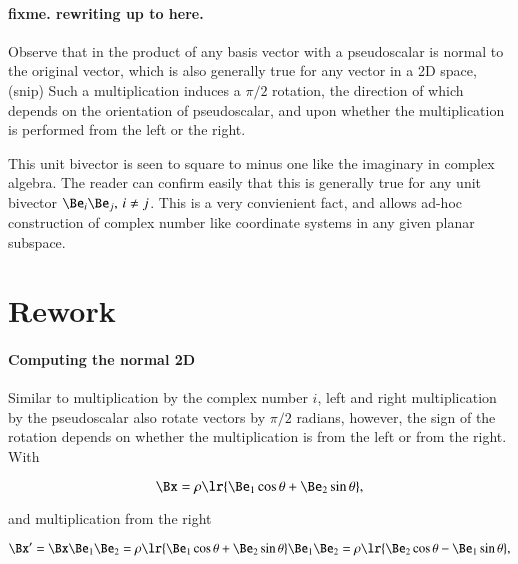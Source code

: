 \paragraph{fixme.  rewriting up to here.}

Observe that in  the product of any basis vector with a pseudoscalar is normal to the original vector, which is also generally true for any vector in a 2D space,
(snip)
Such a multiplication induces a \( \pi/2 \) rotation, the direction of which depends on the orientation of pseudoscalar, and upon whether the multiplication is performed from the left or the right.

This unit bivector is seen to square to minus one like the imaginary in complex algebra.
The reader can confirm easily that this is generally true for any unit bivector \( \Be_i \Be_j, \, i \ne j \).
This is a very convienient fact, and allows ad-hoc construction of complex number like coordinate systems in any given planar subspace.

\section{Rework}
\paragraph{Computing the normal 2D}

Similar to multiplication by the complex number \( i \),
left and right multiplication by the pseudoscalar also rotate vectors by \( \pi/2 \) radians, however, the sign of the rotation depends on whether the multiplication is from the left or from the right.
With

\begin{dmath}\label{eqn:SimpleProducts2:280}
   \Bx = \rho \lr{ \Be_1 \cos\theta + \Be_2 \sin\theta },
\end{dmath}

and multiplication from the right

\begin{dmath}\label{eqn:SimpleProducts2:300}
\Bx'
= \Bx \Be_1 \Be_2
= \rho \lr{ \Be_1 \cos\theta + \Be_2 \sin\theta } \Be_1 \Be_2
= \rho \lr{ \Be_2 \cos\theta - \Be_1 \sin\theta },
\end{dmath}


